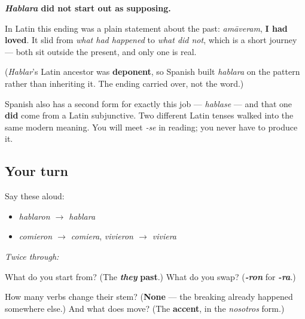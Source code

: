 \begin{cousinweb}
\textbf{\emph{Hablara} did not start out as supposing.}

In Latin this ending was a plain statement about the past: \emph{amāveram}, \textbf{I had loved}. It slid from \emph{what had happened} to \emph{what did not}, which is a short journey — both sit outside the present, and only one is real.

(\emph{Hablar}'s Latin ancestor was \textbf{deponent}, so Spanish built \emph{hablara} on the pattern rather than inheriting it. The ending carried over, not the word.)

Spanish also has a second form for exactly this job — \emph{hablase} — and that one \textbf{did} come from a Latin subjunctive. Two different Latin tenses walked into the same modern meaning. You will meet \emph{-se} in reading; you never have to produce it.
\end{cousinweb}

\subsection*{Your turn}
Say these aloud:

\begin{itemize}
\raggedright
  \item \emph{hablaron $\to$ hablara}
  \item \emph{comieron $\to$ comiera}, \emph{vivieron $\to$ viviera}
\end{itemize}

\emph{Twice through:}

\begin{tcolorbox}[breakable,colback=teal!4,colframe=teal!35!black,title={Before you move on}]
What do you start from? (The \emph{\textbf{they}} \textbf{past}.) What do you swap? (\emph{\textbf{-ron}} for \emph{\textbf{-ra}}.)

How many verbs change their stem? (\textbf{None} — the breaking already happened somewhere else.) And what does move? (The \textbf{accent}, in the \emph{nosotros} form.)
\end{tcolorbox}
